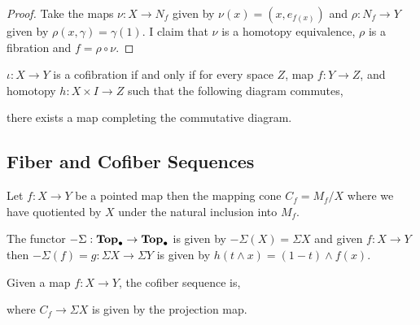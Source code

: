 \documentclass[12pt]{extarticle}
\begin{document}
\begin{proof}
Take the maps $\nu : X \to N_f$ given by $\nu(x) = (x, e_{f(x)})$ and $\rho : N_f \to Y$ given by $\rho(x, \gamma) = \gamma(1)$. I claim that $\nu$ is a homotopy equivalence, $\rho$ is a fibration and $f = \rho \circ \nu$. 
\end{proof}

\begin{lemma}
$\iota : X \to Y$ is a cofibration if and only if for every space $Z$, map $f : Y \to Z$, and homotopy $h : X \times I \to Z$ such that the following diagram commutes,
\begin{center}
\end{center}  
there exists a map completing the commutative diagram.
\end{lemma}


\subsection{Fiber and Cofiber Sequences}

\begin{definition}
Let $f : X \to Y$ be a pointed map then the mapping cone $C_f = M_f / X$ where we have quotiented by $X$ under the natural inclusion into $M_f$.
\end{definition}

\begin{definition}
The functor $-\Sigma : \mathbf{Top}_{\bullet} \to \mathbf{Top}_{\bullet}$ is given by $-\Sigma (X) = \Sigma X$ and given $f : X \to Y$ then $- \Sigma (f) = g : \Sigma X \to \Sigma Y$ is given by $h(t \wedge x) = (1 - t) \wedge f(x)$. 
\end{definition}

\begin{definition}
Given a map $f : X \to Y$, the cofiber sequence is,
\begin{center}
\end{center}  
where $C_f \to \Sigma X$ is given by the projection map.
\end{definition}
\end{document}

